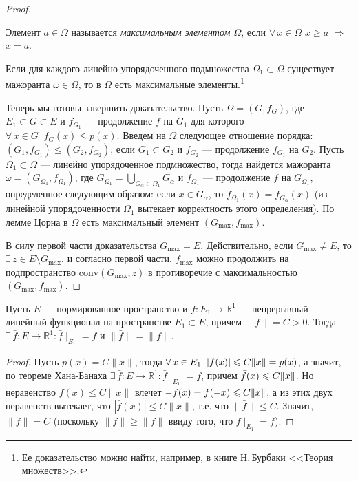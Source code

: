 \documentclass[12pt,titlepage, a4paper]{article}
\begin{document}
\begin{proof}
\begin{defen}
Элемент $a\in\Omega$ называется \emph{максимальным элементом
$\Omega$}, если $\forall\,x\in\Omega$ $x\geqslant a$ $\Rightarrow$
$x=a$.
\end{defen}

\begin{lemm}
Если для каждого линейно упорядоченного подмножества
$\Omega_1\subset \Omega$ существует мажоранта $\omega\in\Omega$, то
в $\Omega$ есть максимальные элементы.\footnote{Ее доказательство
можно найти, например, в книге Н.\,Бурбаки <<Теория множеств>>.}
\end{lemm}

Теперь мы готовы завершить доказательство. Пусть $\Omega=(G, f_G)$,
где $E_1\subset G\subset E$ и $f_{G_1}$ --- продолжение $f$ на $G_1$
для которого $\forall\,x\in G\;\;f_G(x)\leqslant p(x)$. Введем на
$\Omega$ следующее отношение порядка:
$(G_1,f_{G_1})\leqslant(G_2,f_{G_2})$, если $G_1\subset G_2$ и
$f_{G_2}$ --- продолжение $f_{G_1}$ на $G_2$. Пусть $\Omega_1\subset
\Omega$ --- линейно упорядоченное подмножество, тогда найдется
мажоранта $\omega=(G_{\Omega_1},f_{\Omega_1})$, где
$G_{\Omega_1}=\bigcup\limits_{G_\alpha\in\Omega_1}G_\alpha$ и
$f_{\Omega_1}$ --- продолжение $f$ на $G_{\Omega_1}$, определенное
следующим образом: если $x\in G_\alpha$, то
$f_{\Omega_1}(x)=f_{G_\alpha}(x)$ (из линейной упорядоченности
$\Omega_1$ вытекает корректность этого определения). По лемме Цорна
в $\Omega$ есть максимальный элемент $(G_{\max},f_{\max})$.

В силу первой части доказательства $G_{\max}=E$. Действительно, если
$G_{\max}\neq E$, то $\exists\,z\in E\setminus G_{\max}$, и согласно
первой части, $f_{\max}$ можно продолжить на подпространство
$\mathrm{conv}(G_{\max},z)$ в противоречие с максимальностью
$(G_{\max},f_{\max})$.
\end{proof}

\begin{sled}
Пусть $E$ --- нормированное пространство и $f\colon
E_1\to\mathbb{R}^1$ --- непрерывный линейный функционал на
пространстве $E_1\subset E$, причем $\|f\|=C>0$. Тогда
$\exists\,\bar{f}\colon E\to \mathbb{R}^1:\bar{f}\mid_{E_1}=f$ и
$\|\bar{f}\|=\|f\|$.
\end{sled}

\begin{proof}
Пусть $p(x)=C\|x\|$, тогда $\forall\,x\in E_1\;\;|f(x)|\p\leqslant
C\|x\|\p=p(x)$, а значит, по теореме Хана-Банаха
$\exists\,\bar{f}\colon E\to\mathbb{R}^1: \bar{f}\mid_{E_1}=f$,
причем $\bar{f}(x)\p\leqslant C\|x\|$. Но неравенство
$\bar{f}(x)\leqslant C\|x\|$ влечет
$-\bar{f}(x)=\bar{f}(-x)\p\leqslant C\|x\|$, а из этих двух
неравенств вытекает, что $|\bar{f}(x)|\leqslant C\|x\|$, т.е. что
$\|\bar{f}\|\leqslant C$. Значит, $\|\bar{f}\|=C$ (поскольку
$\|\bar{f}\|\geqslant\|f\|$ ввиду того, что $\bar{f}\mid_{E_1}=f$).
\end{proof}
\end{document}
